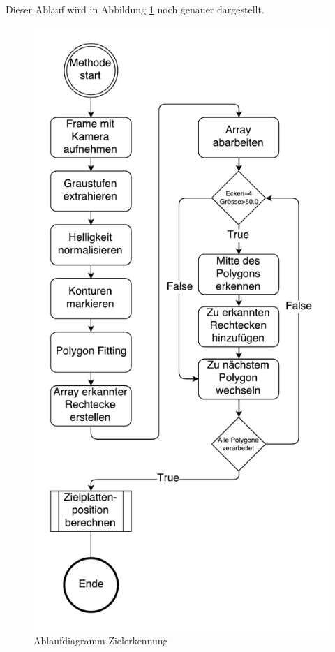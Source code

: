 \documentclass[a4paper]{report}
\begin{document}
Dieser Ablauf wird in Abbildung \ref{fig:ZielerkennungAblauf} noch genauer dargestellt.

\begin{figure}[h!]
	\centering
	\includegraphics[keepaspectratio,height=0.4\textheight]{ZielplatteErkennen}
	\caption{Ablaufdiagramm Zielerkennung}
	\label{fig:ZielerkennungAblauf}
\end{figure}
\end{document}

